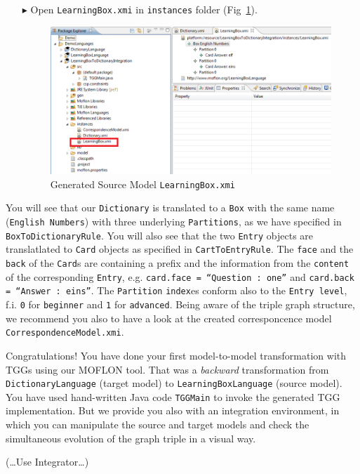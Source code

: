 \begin{enumerate}
\item[$\blacktriangleright$] Open \texttt{LearningBox.xmi} in \texttt{instances} folder (Fig~\ref{fig:learningboxxmi}).

\begin{figure}
\begin{center}
  \includegraphics[width=\textwidth]{pics/tggBilder/transformation/tgg27}
  \caption{Generated Source Model \texttt{LearningBox.xmi}}  
  \label{fig:learningboxxmi}
\end{center}
\end{figure} 

\end{enumerate}

You will see that our \texttt{Dictionary} is translated to a \texttt{Box} with the same name (\texttt{English Numbers}) with three underlying \texttt{Par\-ti\-tions}, as we have specified in \texttt{Box\-To\-Dictionary\-Rule}.
You will also see that the two \texttt{Entry} objects are translatlated to \texttt{Card} objects as specified in \texttt{CartToEntryRule}.
The \texttt{face} and the \texttt{back} of the \texttt{Card}s are containing a prefix and the information from the \texttt{content} of the corresponding \texttt{Entry}, e.g. \texttt{card.face = ``Question : one''} and \texttt{card.back = ``Answer : eins''}. 
The \texttt{Partition} \texttt{index}es conform also to the \texttt{Entry level}, f.i. \texttt{0} for \texttt{beginner} and \texttt{1} for \texttt{advanced}.
Being aware of the triple graph structure, we recommend you also to have a look at the created corresponcence model \texttt{CorrespondenceModel.xmi}.  

Congratulations! You have done your first model-to-model transformation with TGGs using our MOFLON tool. 
That was a \emph{backward} transformation from \texttt{Dictionary\-Language} (target model) to \texttt{Learning\-Box\-Language} (source model). 
You have used hand-written Java code \texttt{TGGMain} to invoke the generated TGG implementation. 
But we provide you also with an integration environment, in which you can manipulate the source and target models and check the simultaneous evolution of the graph triple in a visual way.

(\ldots Use Integrator\ldots) 
